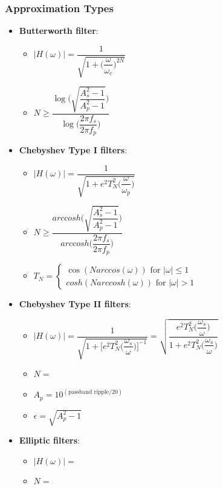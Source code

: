 \documentclass{article}
\begin{document}
\newpage
\subsubsection{Approximation Types}
\begin{itemize}
    \item \textbf{Butterworth filter}:
    \begin{itemize}
	\item $|H(\omega)| = \dfrac{1}{\sqrt{1+\big(\dfrac{\omega}{\omega_c}\big)^{2N}}}$
	\item $N\geq \dfrac{\log\Big(\sqrt{\dfrac{A_s^2-1}{A_p^2-1}}\Big)}{\log\big(\dfrac{2\pi f_s}{2\pi f_p}\big)}$
    \end{itemize}
    \item \textbf{Chebyshev Type I filters}: %
    \begin{itemize}
	\item $|H(\omega)|=\dfrac{1}{\sqrt{1+e^2T_N^2\big(\dfrac{\omega}{\omega_p}\big)}}$
	\item $N\geq \dfrac{arccosh\Big(\sqrt{\dfrac{A_s^2-1}{A_p^2-1}}\Big)}{arccosh\big(\dfrac{2\pi f_s}{2\pi f_p}\big)}$
    \item $T_N=\left\{\begin{array}{ll}
        \cos(N arccos(\omega)) \text{ for } |\omega|\leq 1 \\
        cosh(N arccosh(\omega)) \text{ for } |\omega|> 1 
    \end{array}\right.$
    \end{itemize}
    \item \textbf{Chebyshev Type II filters}:
    \begin{itemize}
	\item $|H(\omega)|
    = \dfrac{1}{\sqrt{1+\big[e^2T_N^2\big(\dfrac{\omega_s}{\omega}\big)\big]^{-1}}} 
    = \sqrt{\dfrac{e^2T_N^2\big(\dfrac{\omega_s}{\omega}\big)}{1+e^2T_N^2\big(\dfrac{\omega_s}{\omega}\big)}}$
	\item $N = $
    \item $A_p = 10^{(\text{passband ripple}/20)}$
    \item $\epsilon = \sqrt{A_p^2-1}$
    \end{itemize}
    \item \textbf{Elliptic filters}:
    \begin{itemize}
	\item $|H(\omega)|=$
	\item $N=$
    \end{itemize}
\end{itemize}
\end{document}
